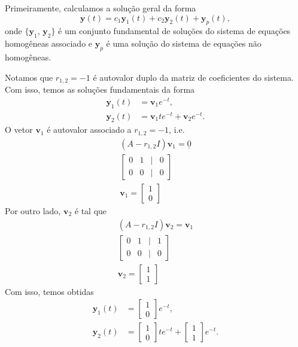 \begin{resol}
  Primeiramente, calculamos a solução geral da forma
  \begin{equation}
    \pmb{y}(t) = c_1\pmb{y}_1(t) + c_2\pmb{y}_2(t) + \pmb{y}_p(t),
  \end{equation}
  onde $\{\pmb{y}_1$, $\pmb{y}_2\}$ é um conjunto fundamental de soluções do sistema de equações homogêneas associado e $\pmb{y}_p$ é uma solução do sistema de equações não homogêneas.

  Notamos que $r_{1,2} = -1$ é autovalor duplo da matriz de coeficientes do sistema. Com isso, temos as soluções fundamentais da forma
  \begin{align}
    \pmb{y}_1(t) &= \pmb{v}_1e^{-t}, \\
    \pmb{y}_2(t) &= \pmb{v}_1te^{-t} + \pmb{v}_2e^{-t}.
  \end{align}
  O vetor $\pmb{v}_1$ é autovalor associado a $r_{1,2}=-1$, i.e.
  \begin{gather}
    (A-r_{1,2}I)\pmb{v}_1 = \underline{0} \\
    \begin{bmatrix}
      0 & 1 & | & 0 \\
      0 & 0 & | & 0
    \end{bmatrix}\\
    \pmb{v}_1 =
    \begin{bmatrix}
      1\\
      0
    \end{bmatrix}
  \end{gather}
  Por outro lado, $\pmb{v}_2$ é tal que
  \begin{gather}
    (A-r_{1,2}I)\pmb{v}_2 = \pmb{v}_1 \\
    \begin{bmatrix}
      0 & 1 & | & 1 \\
      0 & 0 & | & 0
    \end{bmatrix}\\
    \pmb{v}_2 =
    \begin{bmatrix}
      1\\
      1
    \end{bmatrix}
  \end{gather}
  Com isso, temos obtidas
    \begin{align}
    \pmb{y}_1(t) &=
                   \begin{bmatrix}
                     1 \\ 0
                   \end{bmatrix}e^{-t}, \\
    \pmb{y}_2(t) &=
                   \begin{bmatrix}
                     1 \\
                     0
                   \end{bmatrix}te^{-t} +
      \begin{bmatrix}
        1 \\ 1
      \end{bmatrix}e^{-t}.
    \end{align}


\end{resol}
